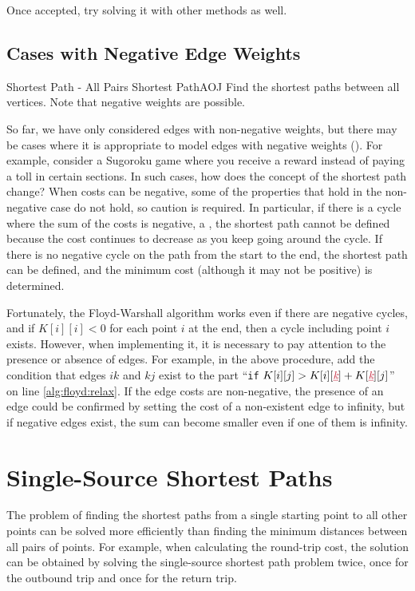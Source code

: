 Once accepted, try solving it with other methods as well.
\subsection{Cases with Negative Edge Weights}

\begin{psbox}{Shortest Path - All Pairs Shortest Path}{AOJ}
  Find the shortest paths between all vertices. Note that negative weights are possible.

\end{psbox}

So far, we have only considered edges with non-negative weights, but there may be cases where it is appropriate to model edges with negative weights ().
For example, consider a Sugoroku game where you receive a reward instead of paying a toll in certain sections.
In such cases, how does the concept of the shortest path change?
When costs can be negative, some of the properties that hold in the non-negative case do not hold, so caution is required. In particular, if there is a cycle where the sum of the costs is negative, a , the shortest path cannot be defined because the cost continues to decrease as you keep going around the cycle.
If there is no negative cycle on the path from the start to the end, the shortest path can be defined, and the minimum cost (although it may not be positive) is determined.

Fortunately, the Floyd-Warshall algorithm works even if there are negative cycles, and if $K[i][i] < 0$ for each point $i$ at the end, then a cycle including point $i$ exists.
However, when implementing it, it is necessary to pay attention to the presence or absence of edges. For example, in the above procedure, add the condition that edges $ik$ and $kj$ exist to the part ``\texttt{if} $K[i][j] > K[i][\cemph{k}]+K[\cemph{k}][j]$'' on line \ref{alg:floyd:relax}. If the edge costs are non-negative, the presence of an edge could be confirmed by setting the cost of a non-existent edge to infinity, but if negative edges exist, the sum can become smaller even if one of them is infinity.
\section{Single-Source Shortest Paths}

The problem of finding the shortest paths from a single starting point to all other points can be solved more efficiently than finding the minimum distances between all pairs of points.
For example, when calculating the round-trip cost, the solution can be obtained by solving the single-source shortest path problem twice, once for the outbound trip and once for the return trip.
